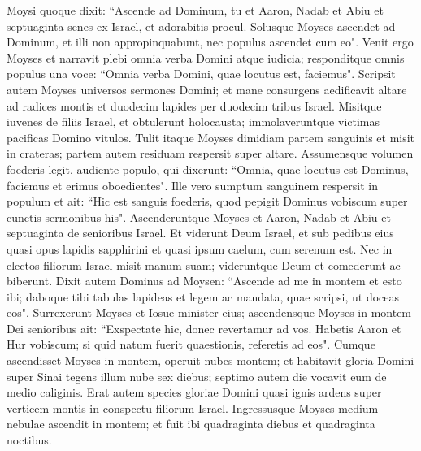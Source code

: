 \begin{biblechapter}  
\verse Moysi quoque dixit: “Ascende ad Dominum, tu et Aaron, Nadab et Abiu et septuaginta senes ex Israel, et adorabitis procul. 
\verse Solusque Moyses ascendet ad Dominum, et illi non appropinquabunt, nec populus ascendet cum eo". 
\verse Venit ergo Moyses et narravit plebi omnia verba Domini atque iudicia; responditque omnis populus una voce: “Omnia verba Domini, quae locutus est, faciemus". 
\verse Scripsit autem Moyses universos sermones Domini; et mane consurgens aedificavit altare ad radices montis et duodecim lapides per duodecim tribus Israel. 
\verse Misitque iuvenes de filiis Israel, et obtulerunt holocausta; immolaveruntque victimas pacificas Domino vitulos. 
\verse Tulit itaque Moyses dimidiam partem sanguinis et misit in crateras; partem autem residuam respersit super altare. 
\verse Assumensque volumen foederis legit, audiente populo, qui dixerunt: “Omnia, quae locutus est Dominus, faciemus et erimus oboedientes". 
\verse Ille vero sumptum sanguinem respersit in populum et ait: “Hic est sanguis foederis, quod pepigit Dominus vobiscum super cunctis sermonibus his". 
\verse Ascenderuntque Moyses et Aaron, Nadab et Abiu et septuaginta de senioribus Israel. 
\verse Et viderunt Deum Israel, et sub pedibus eius quasi opus lapidis sapphirini et quasi ipsum caelum, cum serenum est. 
\verse Nec in electos filiorum Israel misit manum suam; videruntque Deum et comederunt ac biberunt. 
\verse Dixit autem Dominus ad Moysen: “Ascende ad me in montem et esto ibi; daboque tibi tabulas lapideas et legem ac mandata, quae scripsi, ut doceas eos". 
\verse Surrexerunt Moyses et Iosue minister eius; ascendensque Moyses in montem Dei  
\verse senioribus ait: “Exspectate hic, donec revertamur ad vos. Habetis Aaron et Hur vobiscum; si quid natum fuerit quaestionis, referetis ad eos". 
\verse Cumque ascendisset Moyses in montem, operuit nubes montem; 
\verse et habitavit gloria Domini super Sinai tegens illum nube sex diebus; septimo autem die vocavit eum de medio caliginis. 
\verse Erat autem species gloriae Domini quasi ignis ardens super verticem montis in conspectu filiorum Israel. 
\verse Ingressusque Moyses medium nebulae ascendit in montem; et fuit ibi quadraginta diebus et quadraginta noctibus. 
\end{biblechapter}

